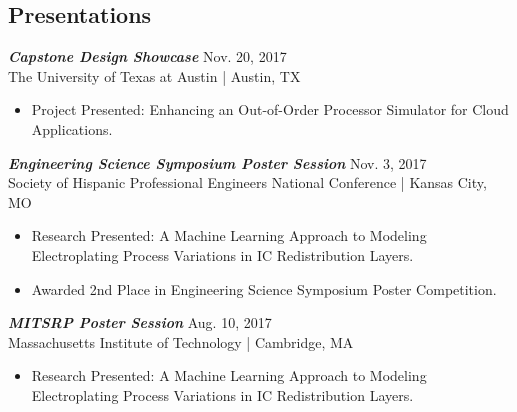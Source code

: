 \documentclass[letter]{res}
\begin{document}
\begin{resume}

\section{Presentations}
{\sl \textbf{Capstone Design Showcase}} \hfill Nov. 20, 2017\\
The University of Texas at Austin | Austin, TX \newline

 \vspace{-4mm}
    
 \begin{itemize}
 \item Project Presented: Enhancing an Out-of-Order Processor Simulator for Cloud Applications.
 \end{itemize}
 
\vspace{-2mm}
{\sl \textbf{Engineering Science Symposium Poster Session}} \hfill Nov. 3, 2017\\
Society of Hispanic Professional Engineers National Conference | Kansas City, MO \newline

 \vspace{-4mm}
    
 \begin{itemize}
 \item Research Presented: A Machine Learning Approach to Modeling Electroplating Process Variations in IC Redistribution Layers.
 \item Awarded 2nd Place in Engineering Science Symposium Poster Competition.
 \end{itemize}
 
\vspace{-2mm}

{\sl \textbf{MITSRP Poster Session}} \hfill Aug. 10, 2017\\
Massachusetts Institute of Technology | Cambridge, MA\newline

 \vspace{-4mm}
 
\begin{itemize}
 \item Research Presented: A Machine Learning Approach to Modeling Electroplating Process Variations in IC Redistribution Layers.
 \end{itemize}

\vspace{-4mm}


\end{resume}
\end{document}
